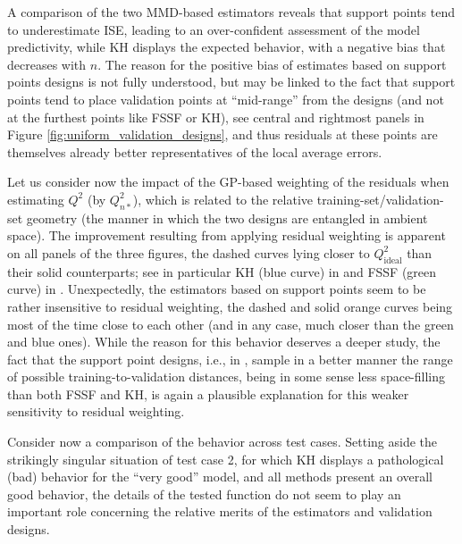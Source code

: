 A comparison of the two MMD-based estimators reveals that support points tend to underestimate ISE, leading to an over-confident assessment of the model predictivity, while KH displays the expected behavior, with a negative bias that decreases with $n$. 
The reason for the positive bias of estimates based on support points designs is not fully understood, but may be linked to the fact that support points tend to place validation points at ``mid-range'' from the designs (and not at the furthest points like FSSF or KH), see central and rightmost panels in Figure \ref{fig:uniform_validation_designs}, and thus residuals at these points are themselves already better representatives of the local average errors. 

Let us consider now the impact of the GP-based weighting of the residuals when estimating $Q^2$ (by $Q_{n*}^2$), which is related to the relative training-set/validation-set geometry (the manner in which the two designs are entangled in ambient space). 
The improvement resulting from applying residual weighting is apparent on all panels of the three figures, the dashed curves lying closer to $Q_{\mathrm{ideal}}^2$ than their solid counterparts; see in particular KH (blue curve) in  and FSSF (green curve) in . 
Unexpectedly, the estimators based on support points seem to be rather insensitive to residual weighting, the dashed and solid orange curves being most of the time close to each other (and in any case, much closer than the green and blue ones). 
While the reason for this behavior deserves a deeper study, the fact that the support point designs, i.e., in , sample in a better manner the range of possible training-to-validation distances, being in some sense less space-filling than both FSSF and KH, is again a plausible explanation for this weaker sensitivity to residual weighting.


Consider now a comparison of the behavior across test cases. 
Setting aside the strikingly singular situation of test case 2, for which KH displays a pathological (bad) behavior for the ``very good'' model, 
and all methods present an overall good behavior, 
the details of the tested function do not seem to play an important role concerning the relative merits of the estimators and validation designs.


